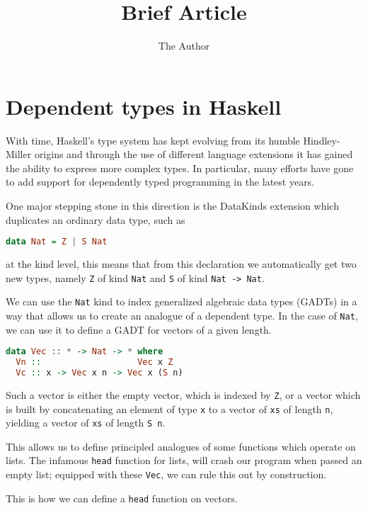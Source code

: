 \documentclass[11pt]{article}
\title{Brief Article}
\author{The Author}
\date{}
\begin{document}
\maketitle


\section{Dependent types in
Haskell}\label{dependent-types-in-haskell}

With time, Haskell's type system has kept evolving from its humble
Hindley-Miller origins and through the use of different language extensions it has gained the ability 
to express more complex types. In particular, many efforts have gone to add support for dependently
typed programming in the latest years.

One major stepping stone in this direction is the DataKinds extension which duplicates an ordinary data type, such as

\begin{lstlisting}[language=haskell]
data Nat = Z | S Nat
\end{lstlisting}

at the kind level, this means that from this declaration we automatically get two new types, namely \texttt{Z} of kind \texttt{Nat}
and \texttt{S} of kind \texttt{Nat\ -\textgreater{}\ Nat}.

We can use the \texttt{Nat} kind to index generalized algebraic data
types (GADTs) in a way that allows us to create an analogue of a
dependent type. In the case of \texttt{Nat}, we can use it to define a
GADT for vectors of a given length.

\begin{lstlisting}[language=haskell]
data Vec :: * -> Nat -> * where
  Vn ::                   Vec x Z
  Vc :: x -> Vec x n -> Vec x (S n)
\end{lstlisting}

Such a vector is either the empty vector, which is indexed by
\texttt{Z}, or a vector which is built by concatenating an element of
type \texttt{x} to a vector of \texttt{xs} of length \texttt{n},
yielding a vector of \texttt{xs} of length \texttt{S\ n}.

This allows us to define principled analogues of some functions which
operate on lists. The infamous \texttt{head} function for lists, will
crash our program when passed an empty list; equipped with these \texttt{Vec}, we can rule this
out by construction. 

This is how we can define a \texttt{head} function on vectors.
\end{document}
